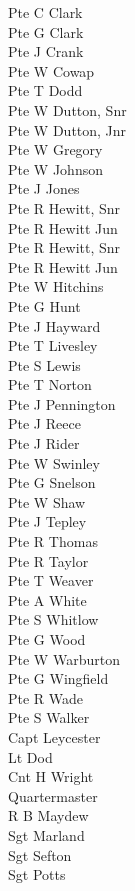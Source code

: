 \begin{multicols}{3}
  Pte C Clark \\
  Pte G Clark \\
  Pte J Crank \\
  Pte W Cowap \\
  Pte T Dodd \\
  Pte W Dutton, Snr \\
  Pte W Dutton, Jnr \\
  Pte W Gregory \\
  Pte W Johnson \\
  Pte J Jones \\
  Pte R Hewitt, Snr \\
  Pte R Hewitt Jun \\
  Pte R Hewitt, Snr \\
  Pte R Hewitt Jun \\
  Pte W Hitchins \\
  Pte G Hunt \\
  Pte J Hayward \\
  Pte T Livesley \\
  Pte S Lewis \\
  Pte T Norton \\
  Pte J Pennington \\
  Pte J Reece \\
  Pte J Rider \\
  Pte W Swinley \\
  Pte G Snelson \\
  Pte W Shaw \\
  Pte J Tepley \\
  Pte R Thomas \\
  Pte R Taylor \\
  Pte T Weaver \\
  Pte A White \\
  Pte S Whitlow \\
  Pte G Wood \\
  Pte W Warburton \\
  Pte G Wingfield \\
  Pte R Wade \\
  Pte S Walker \\
  Capt Leycester \\
  Lt Dod \\
  Cnt H Wright \\
  Quartermaster \\ \indent R B Maydew \\
  Sgt Marland \\
  Sgt Sefton \\
  Sgt Potts \\

\end{multicols}
